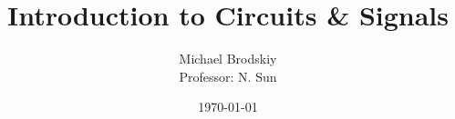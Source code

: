 


\title{Introduction to Circuits \& Signals}
\date{\today}
\author{Michael Brodskiy\\ \small Professor: N. Sun}



\maketitle

